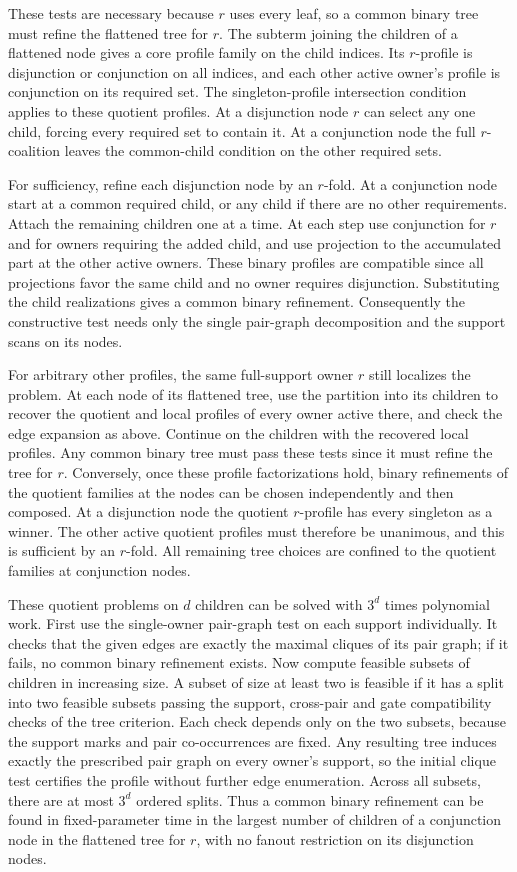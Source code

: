 These tests are necessary because $r$ uses every leaf, so a
common binary tree must refine the flattened tree for $r$.
The subterm joining the children of a flattened node gives a
core profile family on the child indices. Its $r$-profile is
disjunction or conjunction on all indices, and each other
active owner's profile is conjunction on its required set.
The singleton-profile intersection condition applies to these
quotient profiles. At a disjunction node $r$ can select any
one child, forcing every required set to contain it. At a
conjunction node the full $r$-coalition leaves the common-child
condition on the other required sets.

For sufficiency, refine each disjunction node by an $r$-fold.
At a conjunction node start at a common required child, or any
child if there are no other requirements. Attach the remaining
children one at a time. At each step use conjunction for $r$
and for owners requiring the added child, and use projection
to the accumulated part at the other active owners. These
binary profiles are compatible since all projections favor
the same child and no owner requires disjunction. Substituting
the child realizations gives a common binary refinement.
Consequently the constructive test needs only the single
pair-graph decomposition and the support scans on its nodes.

For arbitrary other profiles, the same full-support owner $r$
still localizes the problem. At each node of its flattened tree,
use the partition into its children to recover the quotient
and local profiles of every owner active there, and check the
edge expansion as above. Continue on the children with the
recovered local profiles. Any common binary tree must pass these
tests since it must refine the tree for $r$. Conversely, once
these profile factorizations hold, binary refinements of the
quotient families at the nodes can be chosen independently and
then composed. At a disjunction node the quotient $r$-profile
has every singleton as a winner. The other active quotient
profiles must therefore be unanimous, and this is sufficient
by an $r$-fold. All remaining tree choices are confined to the
quotient families at conjunction nodes.

These quotient problems on $d$ children can be solved with
$3^d$ times polynomial work. First use the single-owner
pair-graph test on each support individually. It checks that
the given edges are exactly the maximal cliques of its pair
graph; if it fails, no common binary refinement exists. Now
compute feasible subsets of children in increasing size. A
subset of size at least two is feasible if it has a split into
two feasible subsets passing the support, cross-pair and gate
compatibility checks of the tree criterion. Each check depends
only on the two subsets, because the support marks and pair
co-occurrences are fixed. Any resulting tree induces exactly
the prescribed pair graph on every owner's support, so the
initial clique test certifies the profile without further edge
enumeration. Across all subsets, there are at most $3^d$
ordered splits. Thus a common binary refinement can be found
in fixed-parameter time in the largest number of children of
a conjunction node in the flattened tree for $r$, with no
fanout restriction on its disjunction nodes.

